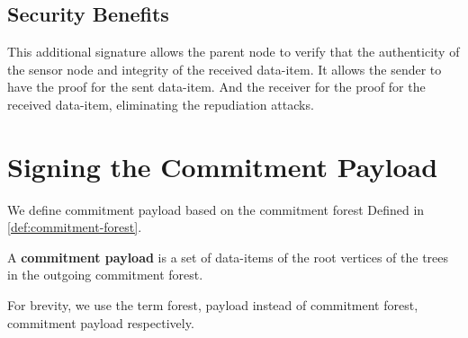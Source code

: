 	\subsection{Security Benefits}
	This additional signature allows the parent node to verify that the authenticity of the sensor node and integrity of the received data-item.
	It allows the sender to have the proof for the sent data-item.
	And the receiver for the proof for the received data-item, eliminating the repudiation attacks.

\section{Signing the Commitment Payload}
		We define commitment payload based on the commitment forest Defined in \ref{def:commitment-forest}.
	\begin{definition}
		A \textbf{commitment payload} is a set of data-items of the root vertices of the trees in the outgoing commitment forest.
	\end{definition}
	For brevity, we use the term forest, payload instead of commitment forest, commitment payload respectively.

